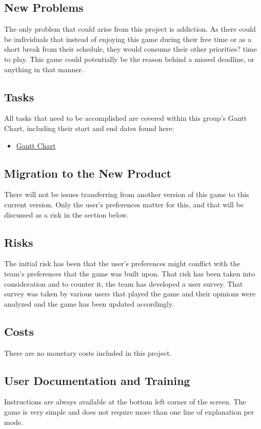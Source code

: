 \documentclass[12pt, titlepage]{article}
\begin{document}
\subsection{New Problems}
The only problem that could arise from this project is addiction. As there could be individuals that instead of enjoying this game during their free time or as a short break from their schedule, they would consume their other priorities? time to play. This game could potentially be the reason behind a missed deadline, or anything in that manner.

\subsection{Tasks}
All tasks that need to be accomplished are covered within this group's Gantt Chart, including their start and end dates found here:

\begin{itemize}
\item \href{run:GanttChart.gan} {Gantt Chart}\\
\end{itemize}

\subsection{Migration to the New Product}
There will not be issues transferring from another version of this game to this current version. Only the user's preferences matter for this, and that will be discussed as a risk in the section below.

\subsection{Risks}
The initial risk has been that the user's preferences might conflict with the team's preferences that the game was built upon. That risk has been taken into consideration and to counter it, the team has developed a user survey. That survey was taken by various users that played the game and their opinions were analyzed and the game has been updated accordingly.

\subsection{Costs}
There are no monetary costs included in this project.

\subsection{User Documentation and Training}
Instructions are always available at the bottom left corner of the screen. The game is very simple and does not require more than one line of explanation per mode.
\end{document}
